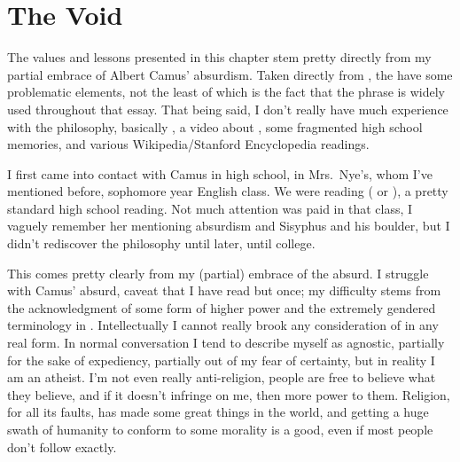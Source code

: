 \documentclass[../butidigress.tex]{subfiles}
\begin{document}
\chapter{The Void}\label{chap:thevoid}
\newpage

The values and lessons presented in this chapter stem pretty directly from my partial embrace of Albert Camus' absurdism.
Taken directly from , the  have some problematic elements, not the least of which is the fact that the phrase  is widely used throughout that essay.
That being said, I don't really have much experience with the philosophy, basically , a video about , some fragmented high school memories, and various Wikipedia/Stanford Encyclopedia readings.

I first came into contact with Camus in high school, in Mrs.~Nye's, whom I've mentioned before, sophomore year English class.
We were reading  ( or ), a pretty standard high school reading.
Not much attention was paid in that class, I vaguely remember her mentioning absurdism and Sisyphus and his boulder, but I didn't rediscover the philosophy until later, until college.


This comes pretty clearly from my (partial) embrace of the absurd.
I struggle with Camus' absurd, caveat that I have read  but once; my difficulty stems from the acknowledgment of some form of higher power and the extremely gendered terminology in .
Intellectually I cannot really brook any consideration of  in any real form.
In normal conversation I tend to describe myself as agnostic, partially for the sake of expediency, partially out of my fear of certainty, but in reality I am an atheist.
I'm not even really anti-religion, people are free to believe what they believe, and if it doesn't infringe on me, then more power to them.
Religion, for all its faults, has made some great things in the world, and getting a huge swath of humanity to conform to some morality is a good, even if most people don't follow exactly.
\end{document}

